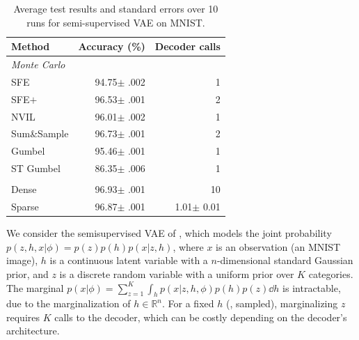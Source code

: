\begin{table}[t]
    \centering
    \tlfstyle
    \begin{tabular}{lrr}
        \toprule
        Method &
        Accuracy (\%)
               & Decoder calls                                                \\
        \midrule

        \multicolumn{3}{l}{\emph{Monte Carlo}}                                \\
        SFE
               & 94.75{\color{gray}$\pm$ .002} & 1                            \\
        SFE$+$
               & 96.53{\color{gray}$\pm$ .001} & 2                            \\
        NVIL
               & 96.01{\color{gray}$\pm$ .002} & 1                            \\
        Sum\&Sample
               & 96.73{\color{gray}$\pm$ .001} & 2                            \\
        Gumbel
               & 95.46{\color{gray}$\pm$ .001} & 1                            \\
        ST Gumbel
               & 86.35{\color{gray}$\pm$ .006} & 1                            \\
        \spacerule
        \multicolumn{3}{l}{\emph{Marginalization}}                            \\
        Dense
               & 96.93{\color{gray}$\pm$ .001} & 10                           \\
        Sparse {\small \color{gray}{(proposed)}}
               & 96.87{\color{gray}$\pm$ .001} & 1.01{\color{gray}$\pm$ 0.01} \\
        \bottomrule
    \end{tabular}
    \caption{\label{tab:ssvaeelbo}
        Average test results and standard errors over 10 runs for semi-supervised VAE on MNIST.}
\end{table}

We consider the semisupervised VAE of \citet{KingmaEtAl2014SSVAE},
which models the joint probability $p(z,h,x|\phi)=p(z)p(h)p(x|z,h)$, where
$x$ is an observation (an MNIST image), $h$ is a continuous latent
variable with a $n$-dimensional standard Gaussian prior, and $z$ is a
discrete random variable with a uniform prior over $K$ categories.
The marginal $p(x | \phi) = \sum_{z=1}^K \int_h p(x | z, h,
    \phi)p(h)p(z) \dd h$ is intractable, due to the marginalization of $h \in
    \mathbb R^n$. For a fixed $h$ (\eg, sampled), marginalizing $z$
requires $K$ calls to the decoder, which can be costly depending on
the decoder's architecture.

